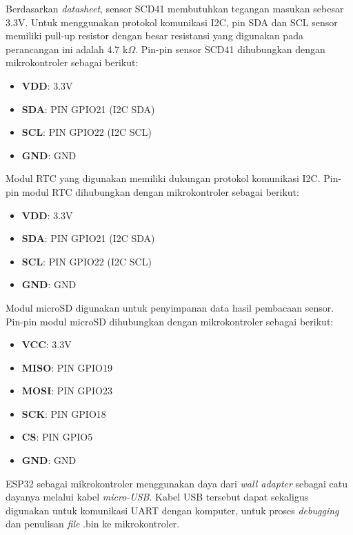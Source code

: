     Berdasarkan \textit{datasheet}, sensor SCD41 membutuhkan tegangan masukan sebesar 3.3V. Untuk menggunakan protokol komunikasi I2C, pin SDA dan SCL sensor memiliki pull-up resistor dengan besar resistansi yang digunakan pada perancangan ini adalah 4.7 k$\Omega$. Pin-pin sensor SCD41 dihubungkan dengan mikrokontroler sebagai berikut:
    \begin{itemize}
        \item \textbf{VDD}: 3.3V
        \item \textbf{SDA}: PIN GPIO21 (I2C SDA)
        \item \textbf{SCL}: PIN GPIO22 (I2C SCL)
        \item \textbf{GND}: GND
    \end{itemize}
    
    Modul RTC yang digunakan memiliki dukungan protokol komunikasi I2C. Pin-pin modul RTC dihubungkan dengan mikrokontroler sebagai berikut:
    \begin{itemize}
        \item \textbf{VDD}: 3.3V
        \item \textbf{SDA}: PIN GPIO21 (I2C SDA)
        \item \textbf{SCL}: PIN GPIO22 (I2C SCL)
        \item \textbf{GND}: GND
    \end{itemize}
    
    Modul microSD digunakan untuk penyimpanan data hasil pembacaan sensor. Pin-pin modul microSD dihubungkan dengan mikrokontroler sebagai berikut:
    \begin{itemize}
        \item \textbf{VCC}: 3.3V
        \item \textbf{MISO}: PIN GPIO19
        \item \textbf{MOSI}: PIN GPIO23
        \item \textbf{SCK}: PIN GPIO18
        \item \textbf{CS}: PIN GPIO5
        \item \textbf{GND}: GND
    \end{itemize}
    
    ESP32 sebagai mikrokontroler menggunakan daya dari \textit{wall adapter} sebagai catu dayanya melalui kabel \textit{micro-USB}. Kabel USB tersebut dapat sekaligus digunakan untuk komunikasi UART dengan komputer, untuk proses \textit{debugging} dan penulisan \textit{file} .bin ke mikrokontroler.
        
